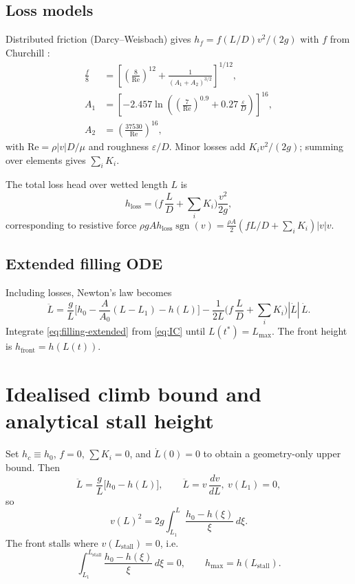 \documentclass[11pt]{article}
\begin{document}
\subsection{Loss models}
Distributed friction (Darcy--Weisbach) gives $h_f=f (L/D) v^2/(2g)$ with $f$ from Churchill \cite{churchill}:
\begin{align}
  \frac{f}{8} &= \left[\left(\frac{8}{\text{Re}}\right)^{12}
  + \frac{1}{(A_1 + A_2)^{3/2}}\right]^{1/12}, \label{eq:churchill-f} \\
  A_1 &= \left[-2.457 \ln\left(\left(\frac{7}{\text{Re}}\right)^{0.9}
  + 0.27\,\frac{\varepsilon}{D}\right)\right]^{16}, \label{eq:churchill-A1} \\
  A_2 &= \left(\frac{37530}{\text{Re}}\right)^{16}, \label{eq:churchill-A2}
\end{align}
with $\text{Re}=\rho |v|D/\mu$ and roughness $\varepsilon/D$. Minor losses add $K_i v^2/(2g)$; summing over elements gives $\sum_i K_i$.

The total loss head over wetted length $L$ is
\[
  h_{\text{loss}} = \Big(f\,\frac{L}{D}+\sum_i K_i\Big)\frac{v^2}{2g},
\]
corresponding to resistive force $\rho g A h_{\text{loss}}\operatorname{sgn}(v) = \tfrac{\rho A}{2}(f L/D + \sum_i K_i)|v|v$.

\subsection{Extended filling ODE}
Including losses, Newton's law becomes
\begin{equation}
  \ddot L
  = \frac{g}{L}\Big[h_0 - \frac{A}{A_0}(L-L_1) - h(L)\Big]
    - \frac{1}{2L}\Big(f\,\frac{L}{D} + \sum_i K_i\Big)|\dot L|\,\dot L.
  \label{eq:filling-extended}
\end{equation}
Integrate \eqref{eq:filling-extended} from \eqref{eq:IC} until $L(t^*)=L_{\max}$. The front height is $h_{\text{front}}=h(L(t))$.

\section{Idealised climb bound and analytical stall height}
\label{sec:bound}
Set $h_c\equiv h_0$, $f=0$, $\sum K_i=0$, and $\dot L(0)=0$ to obtain a geometry-only upper bound. Then
\begin{equation}
  \ddot L = \frac{g}{L}\bigl[h_0 - h(L)\bigr],\qquad \ddot L = v\,\frac{dv}{dL},\ v(L_1)=0,
  \label{eq:ideal-ddot}
\end{equation}
so
\begin{equation}
  v(L)^2 = 2g \int_{L_1}^{L} \frac{h_0 - h(\xi)}{\xi}\,d\xi.
  \label{eq:ideal-v2}
\end{equation}
The front stalls where $v(L_{\text{stall}})=0$, i.e.
\begin{equation}
  \int_{L_1}^{L_{\text{stall}}} \frac{h_0 - h(\xi)}{\xi}\,d\xi = 0,\qquad
  h_{\max}=h(L_{\text{stall}}).
  \label{eq:stall-condition}
\end{equation}
\end{document}
